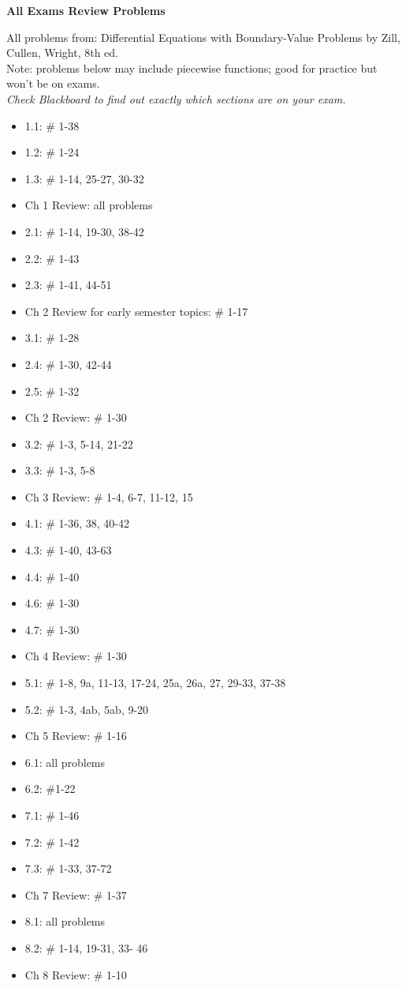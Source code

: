 \documentclass{article}
\begin{document}
\begin{center}{\bf All Exams Review Problems}
\end{center}

\begin{center}
All problems from:  Differential Equations with Boundary-Value Problems by Zill, Cullen, Wright, 8th ed.\\
Note: problems below may include piecewise functions; good for practice but won't be on exams.\\
{\it Check Blackboard to find out exactly which sections are on your exam.}
\end{center}

\thispagestyle{empty}

\begin{itemize}
\item 1.1:  \# 1-38
\item 1.2:  \# 1-24
\item 1.3:  \# 1-14, 25-27, 30-32
\item Ch 1 Review:  all problems
\item 2.1:  \# 1-14, 19-30, 38-42
\item 2.2:  \# 1-43
\item 2.3:  \# 1-41, 44-51
\item Ch 2 Review for early semester topics: \# 1-17
\item 3.1: \# 1-28
\item 2.4:  \# 1-30, 42-44
\item 2.5: \# 1-32
\item Ch 2 Review: \# 1-30
\item 3.2: \# 1-3, 5-14, 21-22
\item 3.3: \# 1-3, 5-8
\item Ch 3 Review: \# 1-4, 6-7, 11-12, 15
\item 4.1:  \# 1-36, 38, 40-42
\item 4.3: \# 1-40, 43-63
\item 4.4: \# 1-40
\item 4.6: \# 1-30
\item 4.7: \# 1-30
\item Ch 4 Review: \# 1-30 
\item 5.1: \# 1-8, 9a, 11-13, 17-24, 25a, 26a, 27, 29-33, 37-38
\item 5.2: \# 1-3, 4ab, 5ab, 9-20
\item Ch 5 Review: \# 1-16
\item 6.1: all problems
\item 6.2: \#1-22
\item 7.1: \# 1-46
\item 7.2: \# 1-42
\item 7.3: \# 1-33, 37-72
\item Ch 7 Review: \# 1-37
\item 8.1: all problems
\item 8.2:  \# 1-14, 19-31, 33- 46
\item Ch 8 Review: \# 1-10
\end{itemize}
\end{document}
